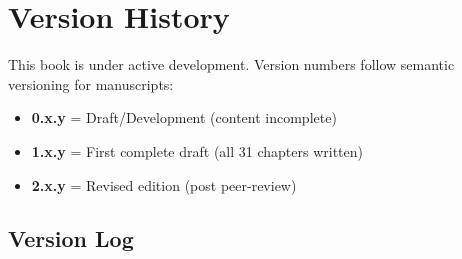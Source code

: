 \chapter*{Version History}

This book is under active development. Version numbers follow semantic versioning for manuscripts:
\begin{itemize}
\item \textbf{0.x.y} = Draft/Development (content incomplete)
\item \textbf{1.x.y} = First complete draft (all 31 chapters written)
\item \textbf{2.x.y} = Revised edition (post peer-review)
\end{itemize}

\section*{Version Log}

